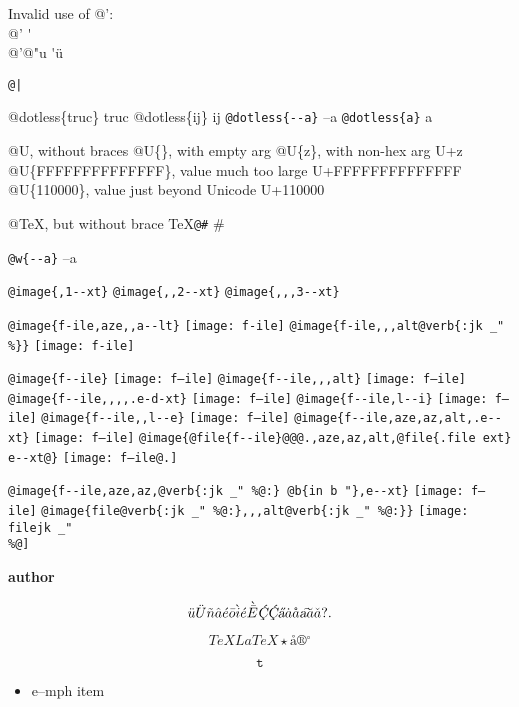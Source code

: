 \documentclass{book}
\renewcommand{\includegraphics}[1]{\fbox{FIG \detokenize{#1}}}
\begin{document}
\begin{titlepage}
Invalid use of @':\leavevmode{}\\
@' \'{}
\leavevmode{}\\
@'@"u \'{}\"{u}

\texttt{@|} 

@dotless\{truc\} truc
@dotless\{ij\} ij
\texttt{@dotless\{{-}{-}a\}} --a
\texttt{@dotless\{a\}} a

@U, without braces @U\{\}, with empty arg 
@U\{z\}, with non-hex arg U+z
@U\{FFFFFFFFFFFFFF\}, value much too large U+FFFFFFFFFFFFFF
@U\{110000\}, value just beyond Unicode U+110000

@TeX, but without brace \TeX{}\texttt{@\#} \#

\texttt{@w\{{-}{-}a\}} \hbox{--a}

\texttt{@image\{,1{-}{-}xt\}} 
\texttt{@image\{,,2{-}{-}xt\}} 
\texttt{@image\{,,,3{-}{-}xt\}} 

\texttt{@image\{f-ile,aze,,a{-}{-}lt\}} \texttt{[image: f-ile]}
\texttt{@image\{f-ile,,,alt@verb\{:jk \_" \%\@\}\}} \texttt{[image: f-ile]}

\texttt{@image\{f{-}{-}ile\}} \texttt{[image: f--ile]}
\texttt{@image\{f{-}{-}ile,,,alt\}} \texttt{[image: f--ile]}
\texttt{@image\{f{-}{-}ile,,,,.e-d-xt\}} \texttt{[image: f--ile]}
\texttt{@image\{f{-}{-}ile,l{-}{-}i\}} \texttt{[image: f--ile]}
\texttt{@image\{f{-}{-}ile,,l{-}{-}e\}} \texttt{[image: f--ile]}
\texttt{@image\{f{-}{-}ile,aze,az,alt,.e{-}{-}xt\}} \texttt{[image: f--ile]}
\texttt{@image\{@file\{f{-}{-}ile\}@@@.,aze,az,alt,@file\{.file ext\} e{-}{-}xt@\}} \texttt{[image: f--ile@.]}

\texttt{@image\{f{-}{-}ile,aze,az,@verb\{:jk \_" \%@:\} @b\{in b "\},e{-}{-}xt\}} \texttt{[image: f--ile]}
\texttt{@image\{file@verb\{:jk \_" \%@:\},,,alt@verb\{:jk \_" \%@:\}\}} \texttt{[image: filejk \_" \\\%@]}


{\bfseries author}%

$$
\ddot{u} \ddot{U} \tilde{n} \hat{a} \acute{e} \bar{o} \grave{i} \acute{e} \grave{\bar{E}}
\textsl{\c{\'{C}}} \textsl{\c{\'{C}}} \textsl{\H{a}} \dot{a} \mathring{a} \textsl{\t{a}}
\breve{a} \check{a}
 ? .
$$

$$
TeX LaTeX \star{} \mathord{\text{\aa{}}} \circledR{} ^{\circ{}} 
$$

$$
\mathtt{t} 
$$

\begin{itemize}[label=\emph{}]
\item e--mph item
\end{itemize}


\end{titlepage}
\end{document}
